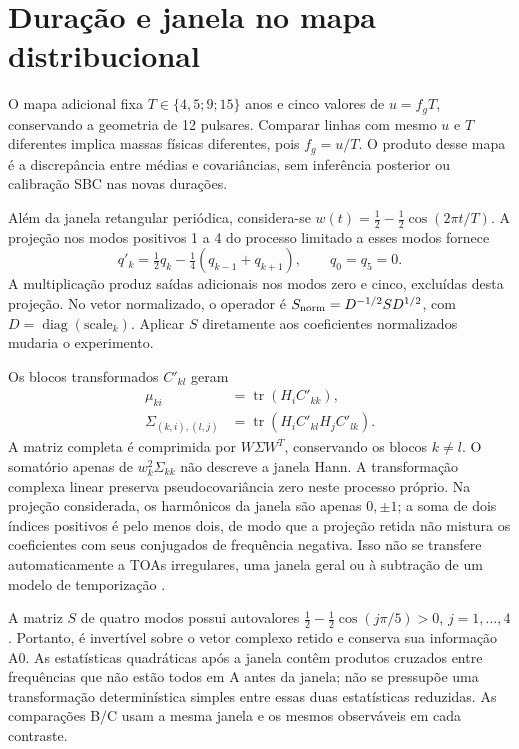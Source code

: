 \section{Duração e janela no mapa distribucional}

O mapa adicional fixa \(T\in\{4{,}5;9;15\}\) anos e cinco valores de
\(u=f_gT\), conservando a geometria de 12 pulsares. Comparar linhas com
mesmo \(u\) e \(T\) diferentes implica massas físicas diferentes, pois \(f_g=u/T\).
O produto desse mapa é a discrepância entre médias e covariâncias, sem
inferência posterior ou calibração SBC nas novas durações.

Além da janela retangular periódica, considera-se
\(w(t)=\tfrac12-\tfrac12\cos(2\pi t/T)\). A projeção nos modos positivos
1 a 4 do processo limitado a esses modos fornece
\begin{equation}
 q'_k=\tfrac12q_k-\tfrac14(q_{k-1}+q_{k+1}),\qquad q_0=q_5=0.
 \label{eq:comp-hann}
\end{equation}
A multiplicação produz saídas adicionais nos modos zero e cinco, excluídas
desta projeção. No vetor normalizado, o operador é
\(S_{\rm norm}=D^{-1/2}SD^{1/2}\), com
\(D=\operatorname{diag}(\mathrm{scale}_k)\). Aplicar \(S\) diretamente aos
coeficientes normalizados mudaria o experimento.

Os blocos transformados \(C'_{kl}\) geram
\begin{align}
 \mu_{ki}&=\operatorname{tr}(H_iC'_{kk}),\nonumber\\
 \Sigma_{(k,i),(l,j)}&=\operatorname{tr}(H_iC'_{kl}H_jC'_{lk}).
 \label{eq:comp-momentos-janela}
\end{align}
A matriz completa é comprimida por \(W\Sigma W^T\), conservando os blocos
\(k\ne l\). O somatório apenas de \(w_k^2\Sigma_{kk}\) não descreve a
janela Hann. A transformação complexa linear preserva pseudocovariância zero
neste processo próprio. Na projeção considerada, os harmônicos da janela
são apenas $0,\pm1$; a soma de dois índices positivos é pelo menos dois,
de modo que a projeção retida não mistura os coeficientes com seus
conjugados de frequência negativa. Isso não se transfere automaticamente a TOAs
irregulares, uma janela geral ou à subtração de um modelo de temporização
\cite{crisostomi2025covariance}.

A matriz \(S\) de quatro modos possui autovalores
\(\tfrac12-\tfrac12\cos(j\pi/5)>0\), \(j=1,\ldots,4\).
Portanto, é invertível sobre o vetor complexo retido e conserva sua
informação A0. As estatísticas quadráticas após a janela contêm produtos
cruzados entre frequências que não estão todos em A antes da janela;
não se pressupõe uma transformação determinística simples entre essas
duas estatísticas reduzidas. As comparações B/C usam a mesma janela e os
mesmos observáveis em cada contraste.


